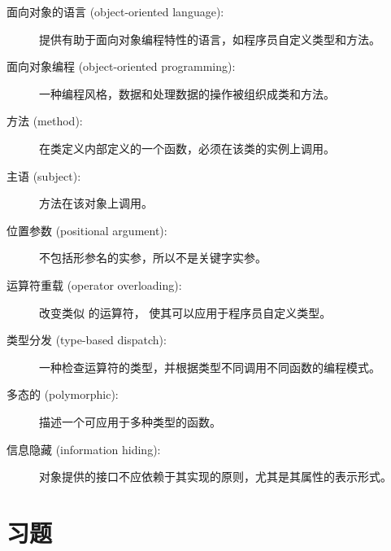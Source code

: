 \begin{description}

\item[面向对象的语言 (object-oriented language):] 提供有助于面向对象编程特性的语言，如程序员自定义类型和方法。

\item[面向对象编程 (object-oriented programming):] 一种编程风格，数据和处理数据的操作被组织成类和方法。

\item[方法 (method):] 在类定义内部定义的一个函数，必须在该类的实例上调用。

\item[主语 (subject):] 方法在该对象上调用。

\item[位置参数 (positional argument):]  不包括形参名的实参，所以不是关键字实参。
  

\item[运算符重载 (operator overloading):] 改变类似 \li{+} 的运算符，
使其可以应用于程序员自定义类型。
  

\item[类型分发 (type-based dispatch):] 一种检查运算符的类型，并根据类型不同调用不同函数的编程模式。

\item[多态的 (polymorphic):] 描述一个可应用于多种类型的函数。

\item[信息隐藏 (information hiding):] 对象提供的接口不应依赖于其实现的原则，尤其是其属性的表示形式。

\end{description}


\section{习题}


